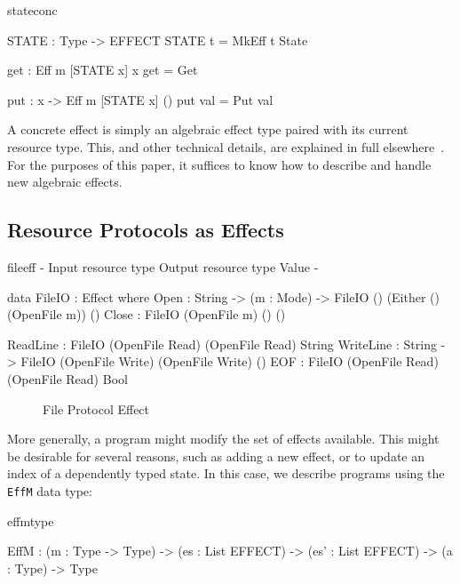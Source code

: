 \begin{SaveVerbatim}{stateconc}

STATE : Type -> EFFECT
STATE t = MkEff t State

get : Eff m [STATE x] x
get = Get 

put : x -> Eff m [STATE x] ()
put val = Put val

\end{SaveVerbatim}

\noindent
A concrete effect is simply an algebraic effect type paired with its current
resource type. This, and other
technical details, are explained in full elsewhere~\cite{brady:effects}.
For the purposes of this paper, it suffices to know how to describe and
handle new algebraic effects.

\subsection{Resource Protocols as Effects}

\begin{SaveVerbatim}{fileeff}
{-                                             { Input resource type }   { Output resource type } { Value } -}
 
data FileIO : Effect where
     Open      : String -> (m : Mode) -> FileIO     ()                    (Either () (OpenFile m)) ()
     Close     :                         FileIO     (OpenFile m)          ()                       ()

     ReadLine  :                         FileIO     (OpenFile Read)       (OpenFile Read)          String
     WriteLine : String ->               FileIO     (OpenFile Write)      (OpenFile Write)         ()
     EOF       :                         FileIO     (OpenFile Read)       (OpenFile Read)          Bool
\end{SaveVerbatim}

\begin{figure*}[t]
\begin{center}
\end{center}
\caption{File Protocol Effect}
\label{fig:fileeffect}
\end{figure*}
More generally, a program might modify the set of effects available.
This might be desirable for several reasons, such as adding a new
effect, or to update an index of a dependently typed state. In this
case, we describe programs using the \texttt{EffM} data type:

\begin{SaveVerbatim}{effmtype}

EffM : (m : Type -> Type) ->
       (es : List EFFECT) -> (es' : List EFFECT) ->
       (a : Type) -> Type

\end{SaveVerbatim}

